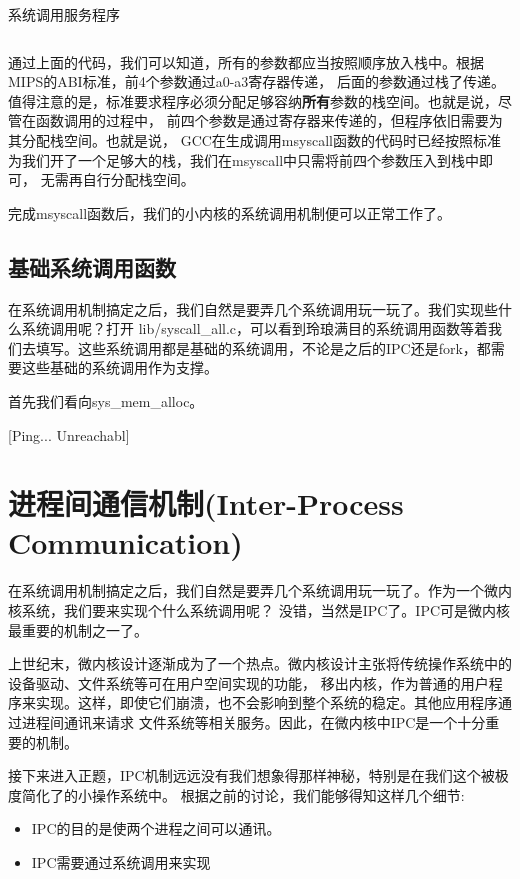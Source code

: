 \begin{codeBoxWithCaption}{系统调用服务程序\label{code:handlesys.S}}
  \inputminted[linenos]{gas}{codes/handlesys.S}
\end{codeBoxWithCaption}

通过上面的代码，我们可以知道，所有的参数都应当按照顺序放入栈中。根据MIPS的ABI标准，前4个参数通过a0-a3寄存器传递，
后面的参数通过栈了传递。值得注意的是，标准要求程序必须分配足够容纳\textbf{所有}参数的栈空间。也就是说，尽管在函数调用的过程中，
前四个参数是通过寄存器来传递的，但程序依旧需要为其分配栈空间。也就是说，
GCC在生成调用msyscall函数的代码时已经按照标准为我们开了一个足够大的栈，我们在msyscall中只需将前四个参数压入到栈中即可，
无需再自行分配栈空间。

完成msyscall函数后，我们的小内核的系统调用机制便可以正常工作了。

\subsection{基础系统调用函数}

在系统调用机制搞定之后，我们自然是要弄几个系统调用玩一玩了。我们实现些什么系统调用呢？打开 lib/syscall\_all.c，可以看到玲琅满目的系统调用函数等着我们去填写。这些系统调用都是基础的系统调用，不论是之后的IPC还是fork，都需要这些基础的系统调用作为支撑。

首先我们看向sys\_mem\_alloc。

[Ping... Unreachabl]

\section{进程间通信机制(Inter-Process Communication)}
在系统调用机制搞定之后，我们自然是要弄几个系统调用玩一玩了。作为一个微内核系统，我们要来实现个什么系统调用呢？
没错，当然是IPC了。IPC可是微内核最重要的机制之一了。

\begin{note}
上世纪末，微内核设计逐渐成为了一个热点。微内核设计主张将传统操作系统中的设备驱动、文件系统等可在用户空间实现的功能，
移出内核，作为普通的用户程序来实现。这样，即使它们崩溃，也不会影响到整个系统的稳定。其他应用程序通过进程间通讯来请求
文件系统等相关服务。因此，在微内核中IPC是一个十分重要的机制。
\end{note}

接下来进入正题，IPC机制远远没有我们想象得那样神秘，特别是在我们这个被极度简化了的小操作系统中。
根据之前的讨论，我们能够得知这样几个细节:

\begin{itemize}
  \item IPC的目的是使两个进程之间可以通讯。
  \item IPC需要通过系统调用来实现
\end{itemize}

